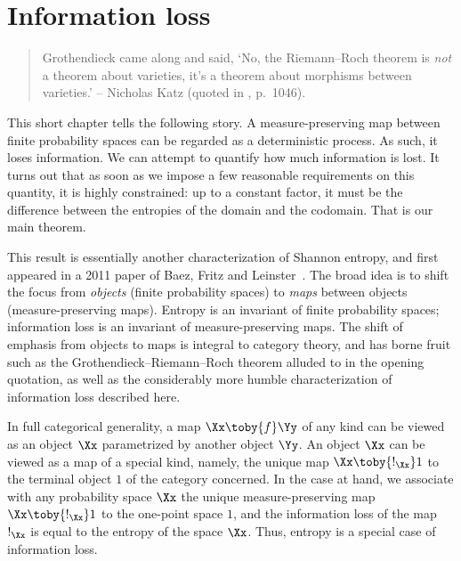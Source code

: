 \chapter{Information loss}


\begin{quote}%
%
% 
Grothendieck came along and said, `No, the Riemann--Roch%
%
% 
theorem is \emph{not} a theorem about varieties, it's a theorem about
morphisms between varieties.'  
% 
\hfill 
% 
-- Nicholas Katz (quoted in \cite{JackCAN}, p.~1046).
\end{quote}

\noindent
This short chapter tells the following story.
% 
A measure-preserving map between finite probability spaces can be regarded
as a deterministic%
%
% 
process.  As such, it loses information.  We can attempt to quantify how
much information is lost.  It turns out that as soon as we impose a few
reasonable requirements on this quantity, it is highly constrained: up to a
constant factor, it must be the difference between the entropies of the
domain and the codomain.  That is our main theorem.

This result is essentially another characterization of Shannon entropy, and
first appeared in a 2011 paper of Baez, Fritz and Leinster~\cite{CETIL}.
The broad idea is to shift the focus from \emph{objects}%
%
% 
(finite probability spaces) to \emph{maps}%
%
% 
between objects (measure-preserving maps).  Entropy is an invariant of
finite probability spaces; information loss is an invariant of
measure-preserving maps.  The shift of emphasis from objects to maps is
integral to category theory, and has borne fruit such as the
Grothendieck--Riemann--Roch theorem alluded to in the opening quotation, as
well as the considerably more humble characterization of information loss
described here.

In full categorical generality, a map $\Xx \toby{f} \Yy$ of any kind can be
viewed as an object $\Xx$ parametrized by another object $\Yy$.
An object $\Xx$ can be viewed as a map of a special kind, namely, the
unique map $\Xx \toby{!_\Xx} 1$ to the terminal object $1$ of the category
concerned.  In the case at hand, we associate with any probability
space $\Xx$ the unique measure-preserving map $\Xx \toby{!_\Xx} 1$ to the
one-point space $1$, and the information loss of the map $!_\Xx$ is equal
to the entropy of the space $\Xx$.  Thus, entropy is a special case of
information loss.

